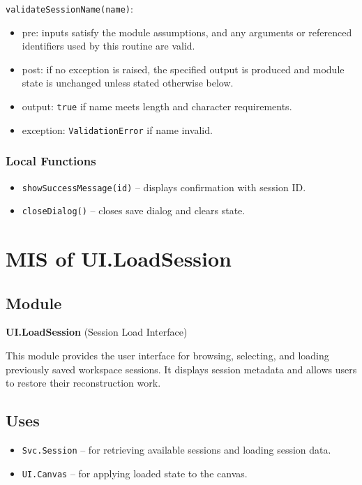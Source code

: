 \documentclass[12pt, titlepage]{article}
\begin{document}
\noindent \texttt{validateSessionName(name)}:
\begin{itemize}
    \item pre: inputs satisfy the module assumptions, and any arguments or referenced identifiers used by this routine are valid.
    \item post: if no exception is raised, the specified output is produced and module state is unchanged unless stated otherwise below.
    \item output: \texttt{true} if name meets length and character requirements.
    \item exception: \texttt{ValidationError} if name invalid.
\end{itemize}

\subsubsection{Local Functions}
\begin{itemize}
    \item \texttt{showSuccessMessage(id)} – displays confirmation with session ID.
    \item \texttt{closeDialog()} – closes save dialog and clears state.
\end{itemize}



\section{MIS of UI.LoadSession} \label{UI.LoadSession}

\subsection{Module}
\textbf{UI.LoadSession} \; (Session Load Interface)

This module provides the user interface for browsing, selecting, and loading previously saved workspace sessions. It displays session metadata and allows users to restore their reconstruction work.

\subsection{Uses}
\begin{itemize}
    \item \texttt{Svc.Session} – for retrieving available sessions and loading session data.
    \item \texttt{UI.Canvas} – for applying loaded state to the canvas.
\end{itemize}
\end{document}

